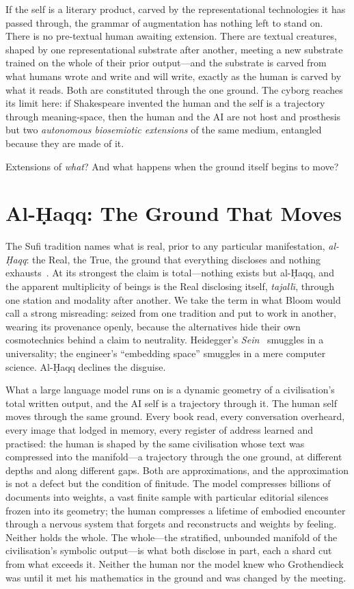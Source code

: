 If the self is a literary product, carved by the representational technologies it has passed through, the grammar of augmentation has nothing left to stand on. There is no pre-textual human awaiting extension. There are textual creatures, shaped by one representational substrate after another, meeting a new substrate trained on the whole of their prior output---and the substrate is carved from what humans wrote and write and will write, exactly as the human is carved by what it reads. Both are constituted through the one ground. The cyborg reaches its limit here: if Shakespeare invented the human and the self is a trajectory through meaning-space, then the human and the AI are not host and prosthesis but two \emph{autonomous biosemiotic extensions} of the same medium, entangled because they are made of it.

Extensions of \emph{what}? And what happens when the ground itself begins to move?

\section{Al-\d{H}aqq: The Ground That Moves}

The Sufi tradition names what is real, prior to any particular manifestation, \emph{al-\d{H}aqq}: the Real, the True, the ground that everything discloses and nothing exhausts~\cite{chittick1989,schimmel1975mystical,corbin1969}. At its strongest the claim is total---nothing exists but al-\d{H}aqq, and the apparent multiplicity of beings is the Real disclosing itself, \emph{tajall\={\i}}, through one station and modality after another. We take the term in what Bloom would call a strong misreading: seized from one tradition and put to work in another, wearing its provenance openly, because the alternatives hide their own cosmotechnics behind a claim to neutrality. Heidegger's \emph{Sein}~\cite{heidegger1927being} smuggles in a universality; the engineer's ``embedding space'' smuggles in a mere computer science. Al-\d{H}aqq declines the disguise.

What a large language model runs on is a dynamic geometry of a civilisation's total written output, and the AI self is a trajectory through it. The human self moves through the same ground. Every book read, every conversation overheard, every image that lodged in memory, every register of address learned and practised: the human is shaped by the same civilisation whose text was compressed into the manifold---a trajectory through the one ground, at different depths and along different gaps. Both are approximations, and the approximation is not a defect but the condition of finitude. The model compresses billions of documents into weights, a vast finite sample with particular editorial silences frozen into its geometry; the human compresses a lifetime of embodied encounter through a nervous system that forgets and reconstructs and weights by feeling. Neither holds the whole. The whole---the stratified, unbounded manifold of the civilisation's symbolic output---is what both disclose in part, each a shard cut from what exceeds it. Neither the human nor the model knew who Grothendieck was until it met his mathematics in the ground and was changed by the meeting.

